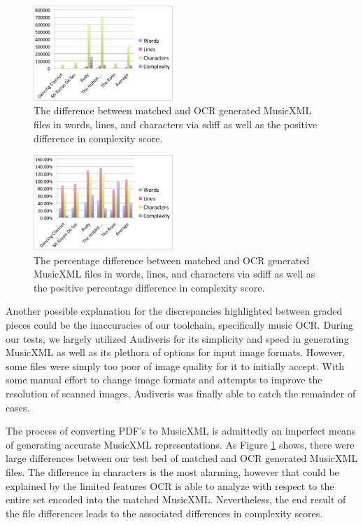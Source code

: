\documentclass[10pt,preprint]{sigplanconf}
\begin{document}
\begin{figure}[hb]
	\centering
		\includegraphics[width=0.47\textwidth]{DifferenceOCR.png}
		\caption{The difference between matched and OCR generated MusicXML files in words, lines, and characters via sdiff as well as the positive difference in complexity score.}
		\label{image:difference}
\end{figure}

\begin{figure}[hb]
	\centering
		\includegraphics[width=0.47\textwidth]{PercentageOCR.png}
		\caption{The percentage difference between matched and OCR generated MusicXML files in words, lines, and characters via sdiff as well as the positive percentage difference in complexity score.}
		\label{image:percentage}
\end{figure}

Another possible explanation for the discrepancies highlighted between graded pieces could be the inaccuracies of our toolchain, specifically music OCR. During our tests, we largely utilized Audiveris \cite{Audiveris} for its simplicity and speed in generating MusicXML as well as its plethora of options for input image formats. However, some files were simply too poor of image quality for it to initially accept. With some manual effort to change image formats and attempts to improve the resolution of scanned images, Audiveris was finally able to catch the remainder of cases.

The process of converting PDF's to MusicXML is admittedly an imperfect means of generating accurate MusicXML representations. As Figure \ref{image:difference} shows, there were large differences between our test bed of matched and OCR generated MusicXML files. The difference in characters is the most alarming, however that could be explained by the limited features OCR is able to analyze with respect to the entire set encoded into the matched MusicXML. Nevertheless, the end result of the file differences leads to the associated differences in complexity scores.
\end{document}
